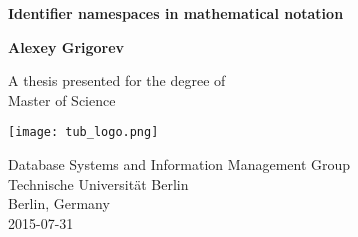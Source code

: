 \begin{titlepage}
\begin{center}
\vspace*{1cm}

\Huge
\textbf{Identifier namespaces in mathematical notation}

\vspace{0.5cm}
\LARGE

\vspace{1.0cm}

\textbf{Alexey Grigorev}

\vfill

A thesis presented for the degree of\\
Master of Science

\vspace{0.8cm}

\texttt{[image: tub\_logo.png]}

\Large
Database Systems and Information Management Group\\
Technische Universit\"{a}t Berlin \\
Berlin, Germany \\
2015-07-31

\end{center}
\end{titlepage}

\newpage
